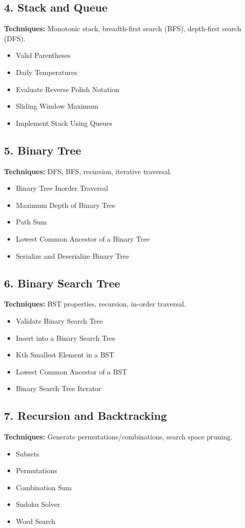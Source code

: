 \documentclass{article}
\begin{document}
\subsection*{4. Stack and Queue}
\textbf{Techniques:} Monotonic stack, breadth-first search (BFS), depth-first search (DFS).
\begin{itemize}[noitemsep]
    \item Valid Parentheses
    \item Daily Temperatures
    \item Evaluate Reverse Polish Notation
    \item Sliding Window Maximum
    \item Implement Stack Using Queues
\end{itemize}

\subsection*{5. Binary Tree}
\textbf{Techniques:} DFS, BFS, recursion, iterative traversal.
\begin{itemize}[noitemsep]
    \item Binary Tree Inorder Traversal
    \item Maximum Depth of Binary Tree
    \item Path Sum
    \item Lowest Common Ancestor of a Binary Tree
    \item Serialize and Deserialize Binary Tree
\end{itemize}

\subsection*{6. Binary Search Tree}
\textbf{Techniques:} BST properties, recursion, in-order traversal.
\begin{itemize}[noitemsep]
    \item Validate Binary Search Tree
    \item Insert into a Binary Search Tree
    \item Kth Smallest Element in a BST
    \item Lowest Common Ancestor of a BST
    \item Binary Search Tree Iterator
\end{itemize}

\subsection*{7. Recursion and Backtracking}
\textbf{Techniques:} Generate permutations/combinations, search space pruning.
\begin{itemize}[noitemsep]
    \item Subsets
    \item Permutations
    \item Combination Sum
    \item Sudoku Solver
    \item Word Search
\end{itemize}
\end{document}
